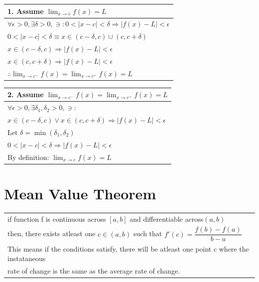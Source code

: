 \documentclass{article}
\begin{document}
\begin{center}
  \begin{minipage}{0.5\linewidth}
  {\renewcommand{\arraystretch}{1.3}
\begin{tabular}{l}
\textbf{1. }Assume $\displaystyle \lim_{x \to c} f(x) = L$\\
\hline
$\forall \epsilon > 0, \exists \delta > 0, \ni: 0 < |x - c| < \delta \Rightarrow |f(x) - L| < \epsilon$\\
$0 < |x - c| < \delta \equiv x \in (c - \delta, c) \cup (c, c + \delta)$\\
$x \in (c - \delta, c) \Rightarrow |f(x) - L| < \epsilon$\\
$x \in (c, c + \delta) \Rightarrow |f(x) - L| < \epsilon$\\
$\therefore \displaystyle \lim_{x \to c^-} f(x) = \lim_{x \to c^+} f(x) = L$
\end{tabular}}

\end{minipage}
\hspace{0.5cm}
\begin{minipage}{0.4\linewidth}
    {\renewcommand{\arraystretch}{1.3}
  \begin{tabular}{l}
\textbf{2. }Assume $\displaystyle \lim_{x \to c^-} f(x) = \lim_{x \to c^+} f(x) = L$\\
\hline
$\forall \epsilon > 0, \exists \delta_1, \delta_2 > 0, \ni:$\\
$x \in (c - \delta, c) \lor x \in (c, c + \delta) \Rightarrow |f(x) - L| < \epsilon$\\
Let $\delta = \min(\delta_1,\delta_2)$\\
$0 < |x - c| < \delta \Rightarrow |f(x) - L| < \epsilon$\\
By definition: $\displaystyle \lim_{x \to c} f(x) = L$
\end{tabular}}

\end{minipage}

\end{center}



\pagebreak

\text{}

\section{Mean Value Theorem}

\begin{tabular}{l}
if function f is continuous across $[a,b]$ and differentiable across$(a,b)$\\
then, there exists atleast one $c \in (a,b)$ such that $f'(c) = \dfrac{f(b) - f(a)}{b - a}$\\
This means if the conditions satisfy, there will be atleast one point c where the instataneous\\
rate of change is the same as the average rate of change.\\
\end{tabular}
\end{document}
